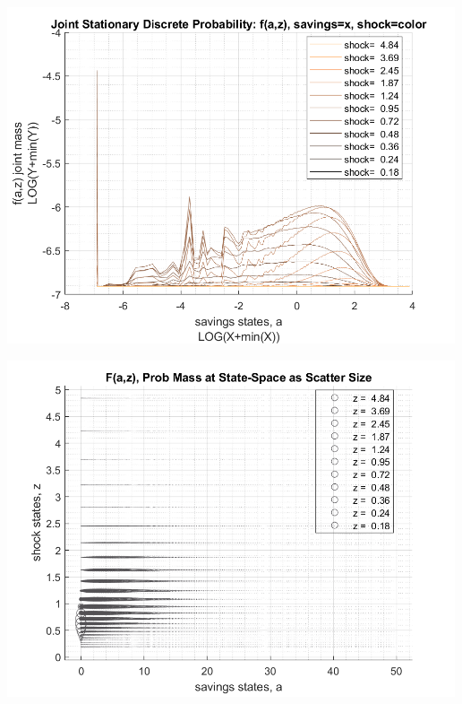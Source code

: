 \documentclass[
]{book}
\begin{document}
\includegraphics[width=5.20833in,height=\textheight]{img/fx_ds_az_cts_vec_images/figure_10.png}

\includegraphics[width=5.20833in,height=\textheight]{img/fx_ds_az_cts_vec_images/figure_11.png}
\end{document}

